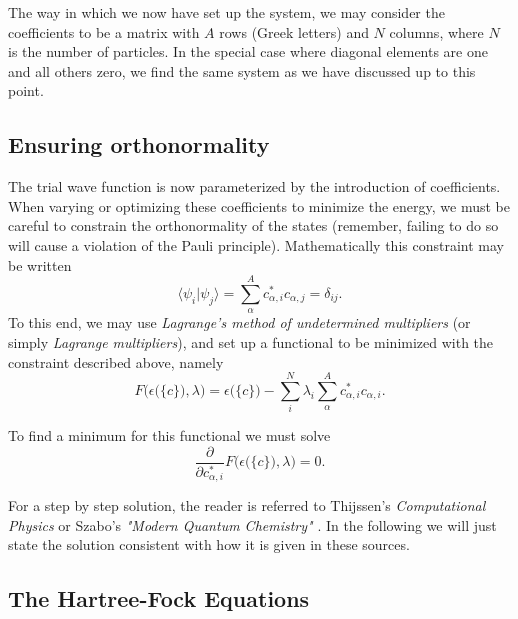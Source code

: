 The way in which we now have set up the system, we may consider the
coefficients to be a matrix with $A$ rows (Greek letters) and $N$
columns, where $N$ is the number of particles. In the special case
where diagonal elements are one and all others zero, we find the same
system as we have discussed up to this point.

\subsection{Ensuring orthonormality}

The trial wave function is now parameterized by the introduction of
coefficients. When varying or optimizing these coefficients to
minimize the energy, we must be careful to constrain the
orthonormality of the states (remember, failing to do so will cause a
violation of the Pauli principle). Mathematically this constraint may
be written
\begin{equation}
\langle \psi_i \vert \psi_j \rangle = \sum_{\alpha}^A c_{\alpha, i}^*c_{\alpha, j} = \delta_{ij}.
\label{eqn:orthonormality}
\end{equation}
To this end, we may use \emph{Lagrange's method of undetermined  multipliers} \cite[p.116]{Szabo} 
(or simply \emph{Lagrange  multipliers}), and set up a functional to be minimized with the
constraint described above, namely
\begin{equation}
 F\big( \epsilon \big( \{c\} \big), \lambda \big) =  \epsilon \big( \{c\} \big) - \sum _i^N \lambda _i \sum _{\alpha}^A c_{\alpha,i}^{*} c_{\alpha,i}.
 \label{lagrange_minim}
\end{equation}

To find a minimum for this functional we must solve
\begin{equation}
\frac{\partial}{\partial c_{\alpha,i}^{*}} F\big(  \epsilon \big( \{c\} \big), \lambda \big) = 0.
\label{eqn:partialset}
\end{equation}

For a step by step solution, the reader is referred to Thijssen's
\emph{Computational Physics} \cite{Thijssen} or Szabo's \emph{"Modern Quantum Chemistry"} \cite{Szabo}. 
In the following we will just
state the solution consistent with how it is given in these sources.

\subsection{The Hartree-Fock Equations}

